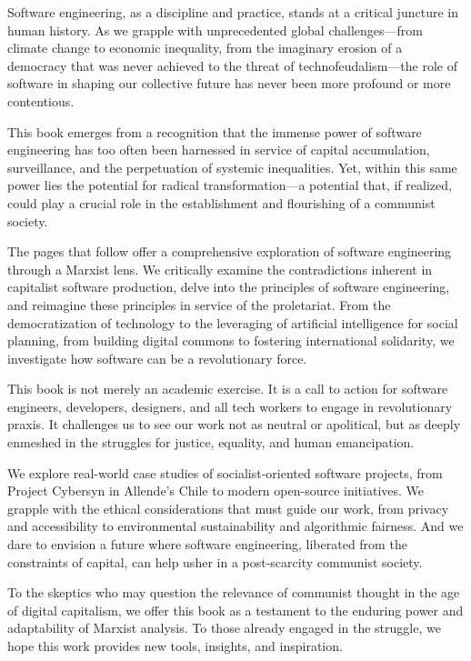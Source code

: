 \documentclass{book}
\begin{document}
\begin{multicols}{2}
{\small
Software engineering, as a discipline and practice, stands at a critical juncture in human history. As we grapple with unprecedented global challenges—from climate change to economic inequality, from the imaginary erosion of a democracy that was never achieved to the threat of technofeudalism—the role of software in shaping our collective future has never been more profound or more contentious.

This book emerges from a recognition that the immense power of software engineering has too often been harnessed in service of capital accumulation, surveillance, and the perpetuation of systemic inequalities. Yet, within this same power lies the potential for radical transformation—a potential that, if realized, could play a crucial role in the establishment and flourishing of a communist society.

The pages that follow offer a comprehensive exploration of software engineering through a Marxist lens. We critically examine the contradictions inherent in capitalist software production, delve into the principles of software engineering, and reimagine these principles in service of the proletariat. From the democratization of technology to the leveraging of artificial intelligence for social planning, from building digital commons to fostering international solidarity, we investigate how software can be a revolutionary force.

This book is not merely an academic exercise. It is a call to action for software engineers, developers, designers, and all tech workers to engage in revolutionary praxis. It challenges us to see our work not as neutral or apolitical, but as deeply enmeshed in the struggles for justice, equality, and human emancipation.

We explore real-world case studies of socialist-oriented software projects, from Project Cybersyn in Allende's Chile to modern open-source initiatives. We grapple with the ethical considerations that must guide our work, from privacy and accessibility to environmental sustainability and algorithmic fairness. And we dare to envision a future where software engineering, liberated from the constraints of capital, can help usher in a post-scarcity communist society.

To the skeptics who may question the relevance of communist thought in the age of digital capitalism, we offer this book as a testament to the enduring power and adaptability of Marxist analysis. To those already engaged in the struggle, we hope this work provides new tools, insights, and inspiration.

}
\end{multicols}
\end{document}
